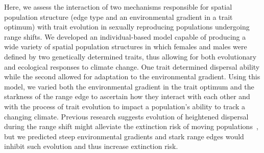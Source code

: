 \documentclass[11pt]{article}
\begin{document}
Here, we assess the interaction of two mechanisms responsible for spatial population structure (edge type and an environmental gradient in a trait optimum) with trait evolution in sexually reproducing populations undergoing range shifts. We developed an individual-based model capable of producing a wide variety of spatial population structures in which females and males were defined by two genetically determined traits, thus allowing for both evolutionary and ecological responses to climate change. One trait determined dispersal ability while the second allowed for adaptation to the environmental gradient. Using this model, we varied both the environmental gradient in the trait optimum and the starkness of the range edge to ascertain how they interact with each other and with the process of trait evolution to impact a population's ability to track a changing climate. Previous research suggests evolution of heightened dispersal during the range shift might alleviate the extinction risk of moving populations~\citep{hargreaves2015fitness, boeye2013more, henry2013eco}, but we predicted steep environmental gradients and stark range edges would inhibit such evolution and thus increase extinction risk.
\end{document}
